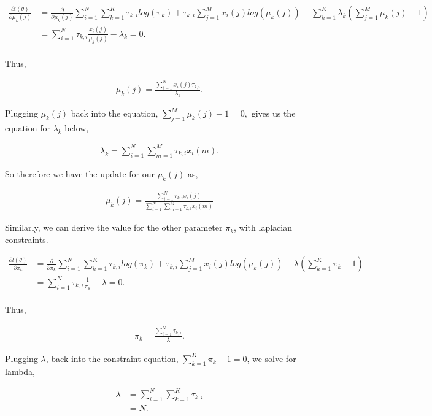 \documentclass[paper=a4, fontsize=11pt]{scrartcl} %
\begin{document}
\begin{align}
\frac{\partial l(\theta)}{\partial \mu_k(j)} &=\frac{\partial}{\partial \mu_k(j)}  \sum_{i=1}^N \sum_{k=1}^K \tau_{k,i} log(\pi_k) + \tau_{k,i}\sum_{j=1}^M x_i(j) log(\mu_k(j)) - \sum_{k=1}^K \lambda_k (\sum_{j=1}^M \mu_k(j) -1) \\
&=  \sum_{i=1}^N  \tau_{k,i} \frac{x_i(j)}{\mu_k(j)} - \lambda_k = 0. \\
\end{align}

Thus, 

\begin{align}
\mu_k(j) =  \frac{\sum_{i=1}^N x_i(j) \tau_{k,i}}{\lambda_k}.
\end{align}

Plugging $\mu_k(j)$ back into the equation, $\sum_{j=1}^M \mu_k(j) -1 = 0,$ gives us the equation for $\lambda_k$ below,

\begin{align}
\lambda_k = \sum_{i=1}^N \sum_{m=1}^M \tau_{k,i} x_i(m).
\end{align}

So therefore we have the update for our $\mu_k(j)$ as, 

\begin{align}
\mu_k(j) = \frac{\sum_{i=1}^N \tau_{k,i} x_i(j)}{\sum_{i=1}^N \sum_{m=1}^M \tau_{k,i} x_i(m)}
\end{align}

Similarly, we can derive the value for the other parameter $\pi_k$, with laplacian constraints.

\begin{align}
\frac{\partial l(\theta)}{\partial \pi_k} &=\frac{\partial}{\partial \pi_k}  \sum_{i=1}^N \sum_{k=1}^K \tau_{k,i} log(\pi_k) + \tau_{k,i}\sum_{j=1}^M x_i(j) log(\mu_k(j)) - \lambda (\sum_{k=1}^K \pi_k -1) \\
&=  \sum_{i=1}^N  \tau_{k,i} \frac{1}{\pi_k} - \lambda = 0. \\
\end{align}

Thus, 

\begin{align}
\pi_k =  \frac{\sum_{i=1}^N \tau_{k,i}}{\lambda}.
\end{align} 

Plugging $\lambda$, back into the constraint equation, $\sum_{k=1}^K \pi_k -1 = 0$, we solve for lambda, 

\begin{align}
\lambda &= \sum_{i=1}^N \sum_{k=1}^K \tau_{k,i} \\
& = N.
\end{align}
\end{document}

